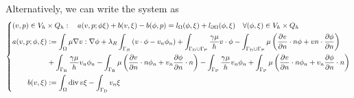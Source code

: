 Alternatively, we can write the system as
%
\begin{equation}\label{eq:stokes:nitsche2}
%
\left\{
\begin{aligned}
&(v,p)\in V_h\times Q_h:\quad a(v,p; \phi\xi) + b(v, \xi)- b(\phi, p) = l_{\Omega}(\phi,\xi)+l_{\partial\Omega}(\phi,\xi) \quad\forall (\phi,\xi)\in V_h\times Q_h\\
&\begin{aligned}
a(v,p; \phi,\xi) &:= \int_{\Omega} \mu \nabla v:\nabla\phi + \lambda_R\int_{\Gamma_R}\left(v\cdot\phi - v_n\phi_n\right)+\int_{\GammaD\cup\GammaP}\frac{\gamma\mu}{h}v\cdot\phi - 
 \int_{\GammaD\cup\GammaP}\mu \left(  \dn{v}\cdot n \phi + v n \cdot \dn{\phi}\right)\\
 &+\int_{\GammaR}\frac{\gamma\mu}{h}v_n\phi_n - \int_{\GammaR} \mu\left( \dn{v}\cdot n \phi_n + v_n\dn{\phi}\cdot n \right)
 -\int_{\GammaP}\frac{\gamma\mu}{h}v_n\phi_n + \int_{\GammaP} \mu\left( \dn{v}\cdot n \phi_n + v_n\dn{\phi}\cdot n \right)\\
b(v, \xi) &:=  \int_{\Omega} \div v \xi - \int_{\GammaD} v_n \xi
\end{aligned}
\end{aligned}
\right.
%
\end{equation}
%
%
